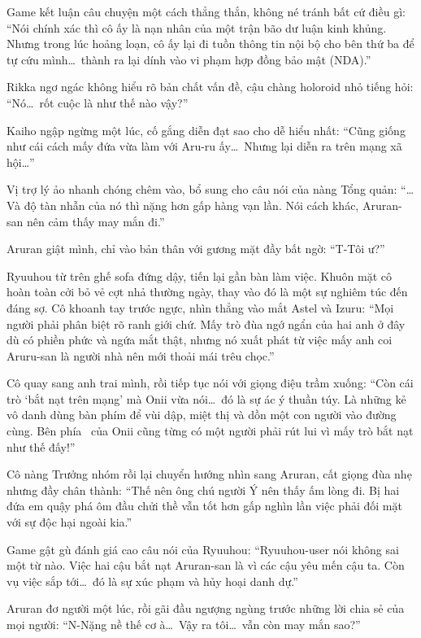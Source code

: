 \documentclass[../main.tex]{subfiles}
\begin{document}
Game kết luận câu chuyện một cách thẳng thắn, không né tránh bất cứ điều gì: ``Nói chính xác thì cô ấy là nạn nhân của một trận bão dư luận kinh khủng. Nhưng trong lúc hoảng loạn, cô ấy lại đi tuồn thông tin nội bộ cho bên thứ ba để tự cứu mình\dots\ thành ra lại dính vào vi phạm hợp đồng bảo mật (NDA).''

Rikka ngơ ngác không hiểu rõ bản chất vấn đề, cậu chàng holoroid nhỏ tiếng hỏi: ``Nó\dots\ rốt cuộc là như thế nào vậy?''

Kaiho ngập ngừng một lúc, cố gắng diễn đạt sao cho dễ hiểu nhất: ``Cũng giống như cái cách mấy đứa vừa làm với Aru-ru ấy\dots\ Nhưng lại diễn ra trên mạng xã hội\dots''

Vị trợ lý ảo nhanh chóng chêm vào, bổ sung cho câu nói của nàng Tổng quản: ``\dots Và độ tàn nhẫn của nó thì nặng hơn gấp hàng vạn lần. Nói cách khác, Aruran-san nên cảm thấy may mắn đi.''

Aruran giật mình, chỉ vào bản thân với gương mặt đầy bất ngờ: ``T-Tôi ư?''

Ryuuhou từ trên ghế sofa đứng dậy, tiến lại gần bàn làm việc. Khuôn mặt cô hoàn toàn cởi bỏ vẻ cợt nhả thường ngày, thay vào đó là một sự nghiêm túc đến đáng sợ. Cô khoanh tay trước ngực, nhìn thẳng vào mắt Astel và Izuru: ``Mọi người phải phân biệt rõ ranh giới chứ. Mấy trò đùa ngớ ngẩn của hai anh ở đây dù có phiền phức và ngứa mắt thật, nhưng nó xuất phát từ việc mấy anh coi Aruru-san là người nhà nên mới thoải mái trêu chọc.''

Cô quay sang anh trai mình, rồi tiếp tục nói với giọng điệu trầm xuống: ``Còn cái trò `bắt nạt trên mạng' mà Onii vừa nói\dots\ đó là sự ác ý thuần túy. Là những kẻ vô danh dùng bàn phím để vùi dập, miệt thị và dồn một con người vào đường cùng. Bên phía \hll\ của Onii cũng từng có một người phải rút lui vì mấy trò bắt nạt như thế đấy!''

Cô nàng Trưởng nhóm rồi lại chuyển hướng nhìn sang Aruran, cất giọng đùa nhẹ nhưng đầy chân thành: ``Thế nên ông chú người Ý nên thấy ấm lòng đi. Bị hai đứa em quậy phá ôm đầu chửi thề vẫn tốt hơn gấp nghìn lần việc phải đối mặt với sự độc hại ngoài kia.''

Game gật gù đánh giá cao câu nói của Ryuuhou: ``Ryuuhou-user nói không sai một từ nào. Việc hai cậu bắt nạt Aruran-san là vì các cậu yêu mến cậu ta. Còn vụ việc sắp tới\dots\ đó là sự xúc phạm và hủy hoại danh dự.''

Aruran đơ người một lúc, rồi gãi đầu ngượng ngùng trước những lời chia sẻ của mọi người: ``N-Nặng nề thế cơ à\dots\ Vậy ra tôi\dots\ vẫn còn may mắn sao?''
\end{document}
